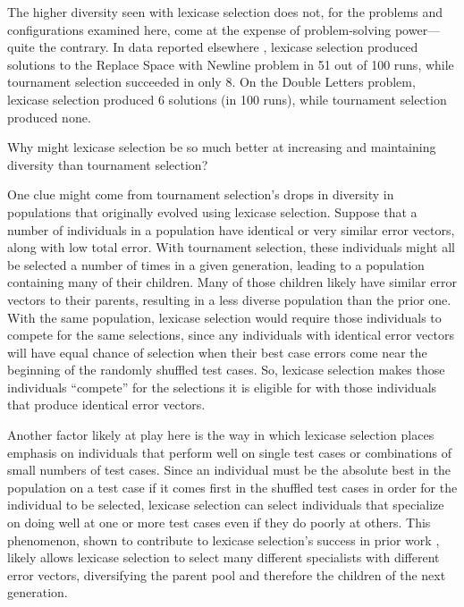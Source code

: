 \documentclass{sig-alternate-05-2015}
\begin{document}
The higher diversity seen with lexicase selection does not, for the problems and configurations examined here, come at the expense of problem-solving power---quite the contrary. In data reported elsewhere \cite{Helmuth:2015:GECCO}, lexicase selection produced solutions to the Replace Space with Newline problem in 51 out of 100 runs, while tournament selection succeeded in only 8. On the Double Letters problem, lexicase selection produced 6 solutions (in 100 runs), while tournament selection produced none.

Why might lexicase selection be so much better at increasing and maintaining diversity than tournament selection?

One clue might come from tournament selection's drops in diversity in populations that originally evolved using lexicase selection. Suppose that a number of individuals in a population have identical or very similar error vectors, along with low total error. With tournament selection, these individuals might all be selected a number of times in a given generation, leading to a population containing many of their children. Many of those children likely have similar error vectors to their parents, resulting in a less diverse population than the prior one. With the same population, lexicase selection would require those individuals to compete for the same selections, since any individuals with identical error vectors will have equal chance of selection when their best case errors come near the beginning of the randomly shuffled test cases. So, lexicase selection makes those individuals ``compete'' for the selections it is eligible for with those individuals that produce identical error vectors.



Another factor likely at play here is the way in which lexicase selection places emphasis on individuals that perform well on single test cases or combinations of small numbers of test cases. Since an individual must be the absolute best in the population on a test case if it comes first in the shuffled test cases in order for the individual to be selected, lexicase selection can select individuals that specialize on doing well at one or more test cases even if they do poorly at others. This phenomenon, shown to contribute to lexicase selection's success in prior work \cite{Helmuth:2015:dissertation}, likely allows lexicase selection to select many different specialists with different error vectors, diversifying the parent pool and therefore the children of the next generation.
\end{document}
